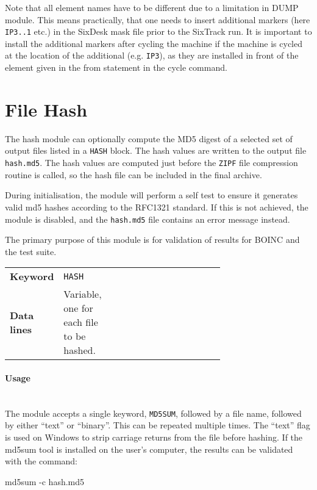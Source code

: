 Note that all element names have to be different due to a limitation in DUMP module. This means practically, that one needs to insert additional markers (here \texttt{IP3..1} etc.) in the SixDesk \cite{sixdesk1,sixdesk2} mask file prior to the SixTrack run. It is important to install the additional markers after cycling the machine if the machine is cycled at the location of the additional (e.g. \texttt{IP3}), as they are installed in front of the element given in the from statement in the cycle command.

\section{File Hash} \label{sec:HASH}

The hash module can optionally compute the MD5 digest of a selected set of output files listed in a \texttt{HASH} block.
The hash values are written to the output file \texttt{hash.md5}.
The hash values are computed just before the \texttt{ZIPF} file compression routine is called, so the hash file can be included in the final archive.

During initialisation, the module will perform a self test to ensure it generates valid md5 hashes according to the RFC1321 standard.
If this is not achieved, the module is disabled, and the \texttt{hash.md5} file contains an error message instead.

The primary purpose of this module is for validation of results for BOINC and the test suite.

\bigskip
\begin{tabular}{@{}llp{0.7\linewidth}}
    \textbf{Keyword}    & \texttt{HASH} \\
    \textbf{Data lines} & Variable, one for each file to be hashed. \\
\end{tabular}

\paragraph{Usage}~\\

The module accepts a single keyword, \texttt{MD5SUM}, followed by a file name, followed by either ``text'' or ``binary''.
This can be repeated multiple times.
The ``text'' flag is used on Windows to strip carriage returns from the file before hashing.
If the md5sum tool is installed on the user's computer, the results can be validated with the command:
\begin{cverbatim}
md5sum -c hash.md5
\end{cverbatim}
    
